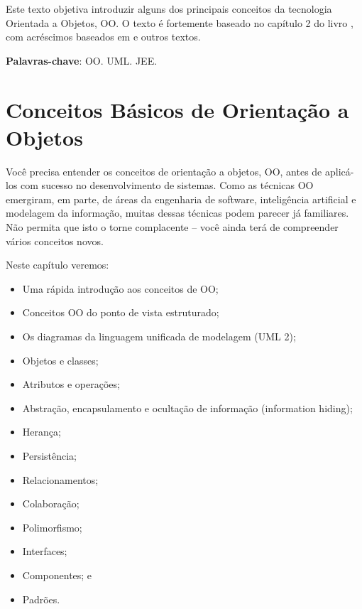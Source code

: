 \documentclass[
	11pt,				%
	openright,
	twoside,			%
	a4paper,			%
	english,			%
	french,
	brazil,				%
	sumario=tradicional
	]{abntex2}
\begin{document}

\frenchspacing 

\maketitle

\begin{resumoumacoluna}
Este texto objetiva introduzir alguns dos principais conceitos da tecnologia Orientada a Objetos, OO.
O texto é fortemente baseado no capítulo 2 do livro \cite{Ambler:TOP:3ed}, com acréscimos baseados em \cite{uml:j2ee} e outros textos.

\vspace{\onelineskip}
\noindent
 \textbf{Palavras-chave}: OO. UML. JEE.
\end{resumoumacoluna}

\textual

\chapter{Conceitos Básicos de Orientação a Objetos}

Você precisa entender os conceitos de orientação a objetos, OO, antes de aplicá-los com sucesso no desenvolvimento de sistemas. Como as técnicas OO emergiram, em parte, de áreas da engenharia de software, inteligência artificial e modelagem da informação, muitas dessas técnicas podem parecer já familiares. Não permita que isto o torne complacente -- você ainda terá de compreender vários conceitos novos.

Neste capítulo veremos:

\begin{itemize}
\item Uma rápida introdução aos conceitos de OO;
\item Conceitos OO do ponto de vista estruturado;
\item Os diagramas da linguagem unificada de modelagem (UML 2);
\item Objetos e classes;
\item Atributos e operações;
\item Abstração, encapsulamento e ocultação de informação (information hiding);
\item Herança;
\item Persistência;
\item Relacionamentos;
\item Colaboração;
\item Polimorfismo;
\item Interfaces;
\item Componentes; e
\item Padrões.
\end{itemize}
\end{document}
